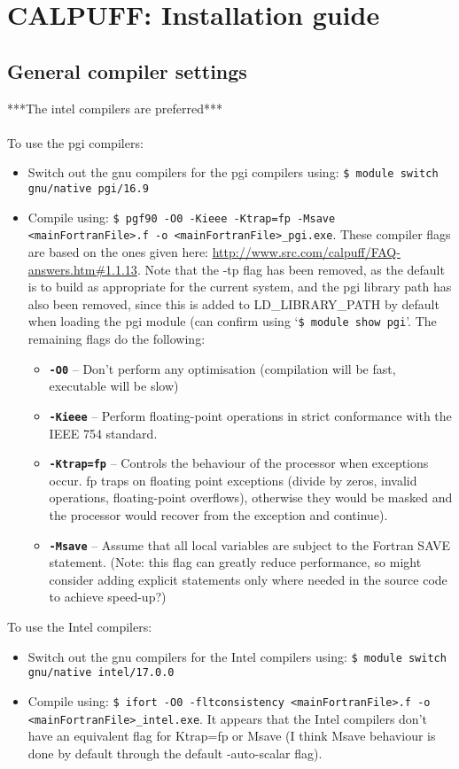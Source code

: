\documentclass[10pt,a4paper]{article}
\begin{document}
\section{CALPUFF: Installation guide} \label{Installation}

\subsection{General compiler settings}
***The intel compilers are preferred***\\\\
To use the pgi compilers:
\begin{itemize}
\item Switch out the gnu compilers for the pgi compilers using: \texttt{\$ module switch gnu/native pgi/16.9}
\item Compile using: \texttt{\$ pgf90 -O0 -Kieee -Ktrap=fp -Msave <mainFortranFile>.f -o <mainFortranFile>\_pgi.exe}. These compiler flags are based on the ones given here: \url{http://www.src.com/calpuff/FAQ-answers.htm#1.1.13}. Note that the -tp flag has been removed, as the default is to build as appropriate for the current system, and the pgi library path has also been removed, since this is added to LD\_LIBRARY\_PATH by default when loading the pgi module (can confirm using `\texttt{\$ module show pgi}'. The remaining flags do the following:
\begin{itemize}
\item \texttt{\textbf{-O0}} -- Don't perform any optimisation (compilation will be fast, executable will be slow)
\item \texttt{\textbf{-Kieee}} -- Perform floating-point operations in strict conformance with the IEEE 754 standard.
\item \texttt{\textbf{-Ktrap=fp}} -- Controls the behaviour of the processor when exceptions occur. fp traps on floating point exceptions (divide by zeros, invalid operations, floating-point overflows), otherwise they would be masked and the processor would recover from the exception and continue).
\item \texttt{\textbf{-Msave}} -- Assume that all local variables are subject to the Fortran SAVE statement. (Note: this flag can greatly reduce performance, so might consider adding explicit statements only where needed in the source code to achieve speed-up?)
\end{itemize}
\end{itemize}
To use the Intel compilers:
\begin{itemize}
\item Switch out the gnu compilers for the Intel compilers using: \texttt{\$ module switch gnu/native intel/17.0.0}
\item Compile using: \texttt{\$ ifort -O0 -fltconsistency <mainFortranFile>.f -o <mainFortranFile>\_intel.exe}. It appears that the Intel compilers don't have an equivalent flag for Ktrap=fp or Msave (I think Msave behaviour is done by default through the default -auto-scalar flag).
\end{itemize}
\end{document}
